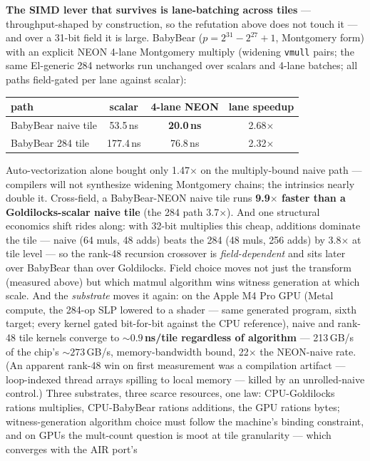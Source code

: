 \documentclass[10pt]{article}
\begin{document}
\textbf{The SIMD lever that survives is lane-batching across
tiles} --- throughput-shaped by construction, so the refutation
above does not touch it --- and over a 31-bit field it is large.
BabyBear ($p = 2^{31}{-}2^{27}{+}1$, Montgomery form) with an
explicit NEON 4-lane Montgomery multiply (widening \texttt{vmull}
pairs; the same El-generic 284 networks run unchanged over scalars
and 4-lane batches; all paths field-gated per lane against
scalar):
\begin{center}
\begin{tabular}{lccc}
path & scalar & 4-lane NEON & lane speedup\\
\hline
BabyBear naive tile & 53.5\,ns & \textbf{20.0\,ns} & 2.68$\times$\\
BabyBear 284 tile & 177.4\,ns & 76.8\,ns & 2.32$\times$\\
\end{tabular}
\end{center}
Auto-vectorization alone bought only 1.47$\times$ on the
multiply-bound naive path --- compilers will not synthesize
widening Montgomery chains; the intrinsics nearly double it.
Cross-field, a BabyBear-NEON naive tile runs \textbf{9.9$\times$
faster than a Goldilocks-scalar naive tile} (the 284 path
3.7$\times$). And one structural economics shift rides along: with
32-bit multiplies this cheap, additions dominate the tile ---
naive (64 muls, 48 adds) beats the 284 (48 muls, 256 adds) by
3.8$\times$ at tile level --- so the rank-48 recursion crossover
is \emph{field-dependent} and sits later over BabyBear than over
Goldilocks. Field choice moves not just the transform (measured
above) but which matmul algorithm wins witness generation at
which scale. And the \emph{substrate} moves it again: on the
Apple M4 Pro GPU (Metal compute, the 284-op SLP lowered to a
shader --- same generated program, sixth target; every kernel
gated bit-for-bit against the CPU reference), naive and rank-48
tile kernels converge to \textbf{${\sim}0.9$\,ns/tile regardless
of algorithm} --- 213\,GB/s of the chip's ${\sim}273$\,GB/s,
memory-bandwidth bound, 22$\times$ the NEON-naive rate. (An
apparent rank-48 win on first measurement was a compilation
artifact --- loop-indexed thread arrays spilling to local memory
--- killed by an unrolled-naive control.) Three substrates, three
scarce resources, one law: CPU-Goldilocks rations multiplies,
CPU-BabyBear rations additions, the GPU rations bytes;
witness-generation algorithm choice must follow the machine's
binding constraint, and on GPUs the mult-count question is moot
at tile granularity --- which converges with the AIR port's
\end{document}
